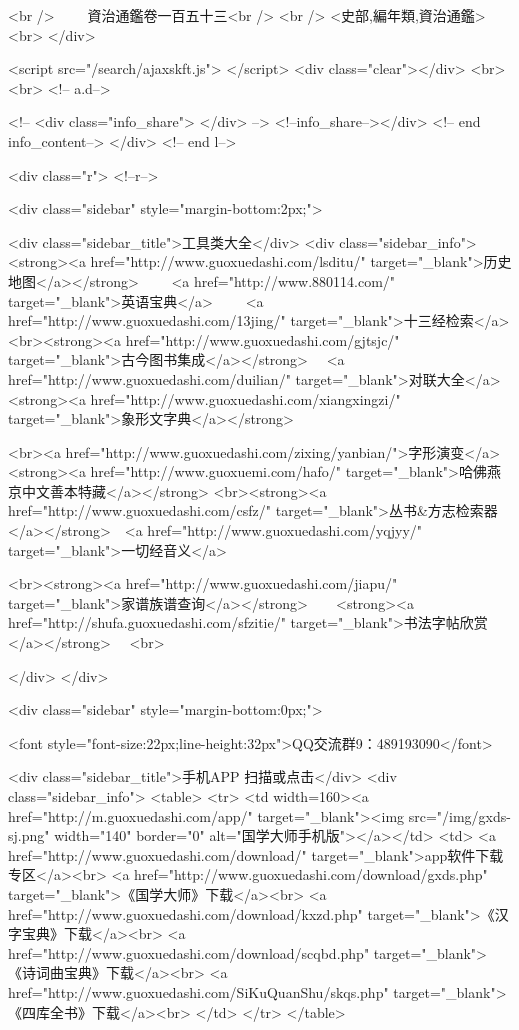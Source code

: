 <br />
　　資治通鑑卷一百五十三<br />
<br />
<史部,編年類,資治通鑑>  <br>
   </div> 

<script src="/search/ajaxskft.js"> </script>
 <div class="clear"></div>
<br>
<br>
 <!-- a.d-->

 <!--
<div class="info_share">
</div> 
-->
 <!--info_share--></div>   <!-- end info_content-->
  </div> <!-- end l-->

<div class="r">   <!--r-->



<div class="sidebar"  style="margin-bottom:2px;">

 
<div class="sidebar_title">工具类大全</div>
<div class="sidebar_info">
<strong><a href="http://www.guoxuedashi.com/lsditu/" target="_blank">历史地图</a></strong>　　
<a href="http://www.880114.com/" target="_blank">英语宝典</a>　　
<a href="http://www.guoxuedashi.com/13jing/" target="_blank">十三经检索</a>　
<br><strong><a href="http://www.guoxuedashi.com/gjtsjc/" target="_blank">古今图书集成</a></strong>　
<a href="http://www.guoxuedashi.com/duilian/" target="_blank">对联大全</a>　<strong><a href="http://www.guoxuedashi.com/xiangxingzi/" target="_blank">象形文字典</a></strong>　

<br><a href="http://www.guoxuedashi.com/zixing/yanbian/">字形演变</a>　　<strong><a href="http://www.guoxuemi.com/hafo/" target="_blank">哈佛燕京中文善本特藏</a></strong>
<br><strong><a href="http://www.guoxuedashi.com/csfz/" target="_blank">丛书&方志检索器</a></strong>　<a href="http://www.guoxuedashi.com/yqjyy/" target="_blank">一切经音义</a>　　

<br><strong><a href="http://www.guoxuedashi.com/jiapu/" target="_blank">家谱族谱查询</a></strong>　　<strong><a href="http://shufa.guoxuedashi.com/sfzitie/" target="_blank">书法字帖欣赏</a></strong>　
<br>

</div>
</div>


<div class="sidebar" style="margin-bottom:0px;">

<font style="font-size:22px;line-height:32px">QQ交流群9：489193090</font>


<div class="sidebar_title">手机APP 扫描或点击</div>
<div class="sidebar_info">
<table>
<tr>
	<td width=160><a href="http://m.guoxuedashi.com/app/" target="_blank"><img src="/img/gxds-sj.png" width="140"  border="0" alt="国学大师手机版"></a></td>
	<td>
<a href="http://www.guoxuedashi.com/download/" target="_blank">app软件下载专区</a><br>
<a href="http://www.guoxuedashi.com/download/gxds.php" target="_blank">《国学大师》下载</a><br>
<a href="http://www.guoxuedashi.com/download/kxzd.php" target="_blank">《汉字宝典》下载</a><br>
<a href="http://www.guoxuedashi.com/download/scqbd.php" target="_blank">《诗词曲宝典》下载</a><br>
<a href="http://www.guoxuedashi.com/SiKuQuanShu/skqs.php" target="_blank">《四库全书》下载</a><br>
</td>
</tr>
</table>

